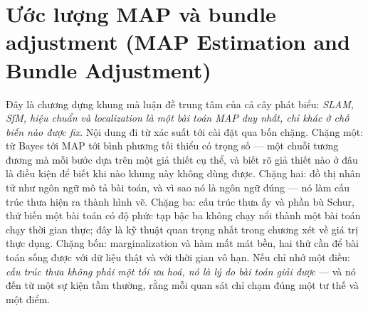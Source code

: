 \documentclass[../../vslam.tex]{subfiles}
\begin{document}
\chapter{Ước lượng MAP và bundle adjustment (MAP Estimation and Bundle Adjustment)}

\begin{tomtat}
Đây là chương dựng khung mà luận đề trung tâm của cả cây phát biểu: \emph{SLAM, SfM, hiệu chuẩn và localization là một bài toán MAP duy nhất, chỉ khác ở chỗ biến nào được fix}. Nội dung đi từ xác suất tới cài đặt qua bốn chặng. Chặng một: từ Bayes tới MAP tới bình phương tối thiểu có trọng số --- một chuỗi tương đương mà mỗi bước dựa trên một giả thiết cụ thể, và biết rõ giả thiết nào ở đâu là điều kiện để biết khi nào khung này không dùng được. Chặng hai: đồ thị nhân tử như ngôn ngữ mô tả bài toán, và vì sao nó là ngôn ngữ đúng --- nó làm cấu trúc thưa hiện ra thành hình vẽ. Chặng ba: cấu trúc thưa ấy và phần bù Schur, thứ biến một bài toán có độ phức tạp bậc ba không chạy nổi thành một bài toán chạy thời gian thực; đây là kỹ thuật quan trọng nhất trong chương xét về giá trị thực dụng. Chặng bốn: marginalization và hàm mất mát bền, hai thứ cần để bài toán sống được với dữ liệu thật và với thời gian vô hạn. Nếu chỉ nhớ một điều: \emph{cấu trúc thưa không phải một tối ưu hoá, nó là lý do bài toán giải được} --- và nó đến từ một sự kiện tầm thường, rằng mỗi quan sát chỉ chạm đúng một tư thế và một điểm.
\end{tomtat}
\end{document}

